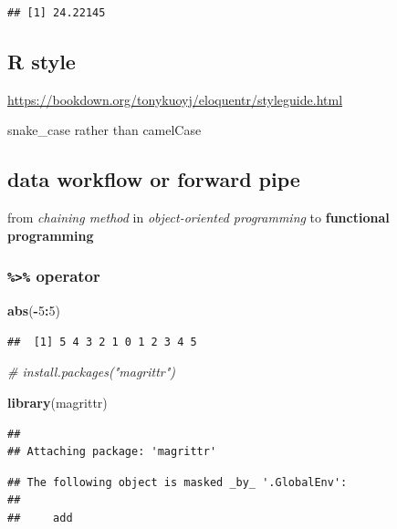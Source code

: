 \documentclass[
]{book}
\newenvironment{Shaded}{\begin{snugshade}}{\end{snugshade}}
\newcommand{\CommentTok}[1]{\textcolor[rgb]{0.56,0.35,0.01}{\textit{#1}}}
\newcommand{\DecValTok}[1]{\textcolor[rgb]{0.00,0.00,0.81}{#1}}
\newcommand{\FunctionTok}[1]{\textcolor[rgb]{0.13,0.29,0.53}{\textbf{#1}}}
\newcommand{\NormalTok}[1]{#1}
\newcommand{\SpecialCharTok}[1]{\textcolor[rgb]{0.81,0.36,0.00}{\textbf{#1}}}
\theoremstyle{definition}
\theoremstyle{definition}
\theoremstyle{definition}
\theoremstyle{definition}
\theoremstyle{remark}
\begin{document}
\begin{verbatim}
## [1] 24.22145
\end{verbatim}

\hypertarget{r-style}{%
\subsection{R style}\label{r-style}}

\url{https://bookdown.org/tonykuoyj/eloquentr/styleguide.html}

snake\_case rather than camelCase

\hypertarget{data-workflow-or-forward-pipe}{%
\subsection{data workflow or forward pipe}\label{data-workflow-or-forward-pipe}}

from \emph{chaining method} in \emph{object-oriented programming}
to \textbf{functional programming}

\hypertarget{operator}{%
\subsubsection{\texorpdfstring{\texttt{\%\textgreater{}\%} operator}{\%\textgreater\% operator}}\label{operator}}

\begin{Shaded}
\begin{Highlighting}[]
\FunctionTok{abs}\NormalTok{(}\SpecialCharTok{{-}}\DecValTok{5}\SpecialCharTok{:}\DecValTok{5}\NormalTok{)}
\end{Highlighting}
\end{Shaded}

\begin{verbatim}
##  [1] 5 4 3 2 1 0 1 2 3 4 5
\end{verbatim}

\begin{Shaded}
\begin{Highlighting}[]
\CommentTok{\# install.packages("magrittr")}

\FunctionTok{library}\NormalTok{(magrittr)}
\end{Highlighting}
\end{Shaded}

\begin{verbatim}
## 
## Attaching package: 'magrittr'
\end{verbatim}

\begin{verbatim}
## The following object is masked _by_ '.GlobalEnv':
## 
##     add
\end{verbatim}
\end{document}

